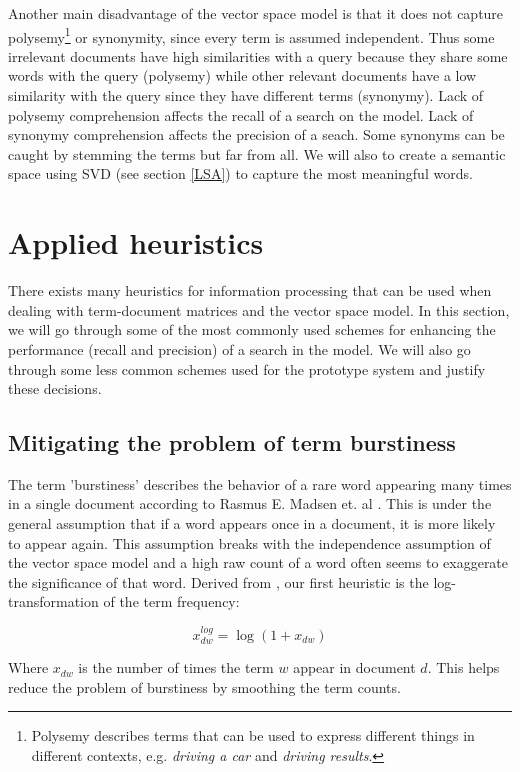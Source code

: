 Another main disadvantage of the vector space model is that it does
not capture polysemy\footnote{Polysemy describes terms that can be
  used to express different things in different contexts,
  e.g. \textit{driving a car} and \textit{driving results}. } or
synonymity, since every term is assumed independent. Thus some
irrelevant documents have high similarities with a query because they
share some words with the query (polysemy) while other relevant
documents have a low similarity with the query since they have
different terms (synonymy).  Lack of polysemy comprehension affects
the recall of a search on the model. Lack of synonymy comprehension
affects the precision of a seach. Some synonyms can be caught by
stemming the terms but far from all. We will also to create a
semantic space using SVD (see section \ref{LSA}) to capture the most
meaningful words.

\section{Applied heuristics}

There exists many heuristics for information processing that can be
used when dealing with term-document matrices and the vector space
model. In this section, we will go through some of the most commonly
used schemes for enhancing the performance (recall and precision) of a
search in the model. We will also go through some less common schemes
used for the prototype system and justify these decisions.

\subsection{Mitigating the problem of term burstiness\label{MitigatingBurstiness}}

The term 'burstiness' describes the behavior of a rare word appearing
many times in a single document according to Rasmus E. Madsen et. al
\cite{ModelingWordBurstiness2005}. This is under the general
assumption that if a word appears once in a document, it is more
likely to appear again. This assumption breaks with the independence
assumption of the vector space model and a high raw count of a word
often seems to exaggerate the significance of that word. Derived from
\cite{ModelingWordBurstiness2005}, our first heuristic is the
log-transformation of the term frequency:

\[
x_{dw}^{log} = \log{(1 + x_{dw})}
\]

Where $x_{dw}$ is the number of times the term $w$ appear in document
$d$. This helps reduce the problem of burstiness by smoothing the term
counts.

